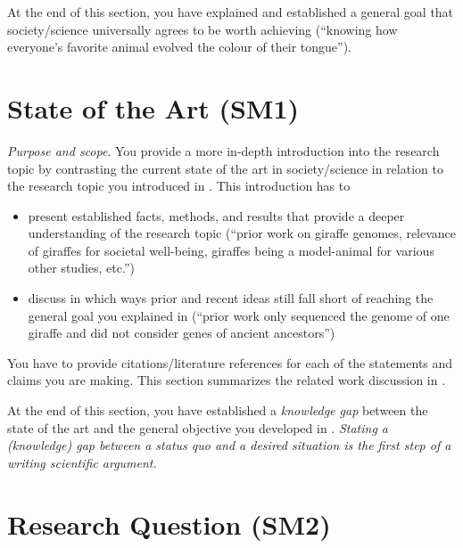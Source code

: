 At the end of this section, you have explained and established a general goal that society/science universally agrees to be worth achieving (``knowing how everyone's favorite animal evolved the colour of their tongue'').

\section{State of the Art (SM1)}\label{sec:introduction:state-of-art}

\emph{Purpose and scope}.
You provide a more in-depth introduction into the research topic by contrasting the current state of the art in society/science in relation to the research topic you introduced in .
This introduction has to

\begin{itemize}
  \item present established facts, methods, and results that provide a deeper understanding of the research topic (``prior work on giraffe genomes, relevance of giraffes for societal well-being, giraffes being a model-animal for various other studies, etc.'')
  \item discuss in which ways prior and recent ideas still fall short of reaching the general goal you explained in  (``prior work only sequenced the genome of one giraffe and did not consider genes of ancient ancestors'')
\end{itemize}

You have to provide citations/literature references for each of the statements and claims you are making.
This section summarizes the related work discussion in .

At the end of this section, you have established a \emph{knowledge gap} between the state of the art and the general objective you developed in .
\emph{Stating a (knowledge) gap between a status quo and a desired situation is the \emph{first step} of a writing scientific argument.}

\section{Research Question (SM2)}\label{sec:introduction:research-question}

